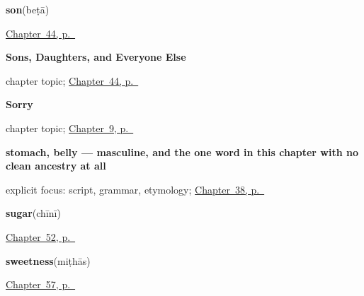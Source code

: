 \noindent\begin{minipage}[t]{\linewidth}
\raggedright
\textbf{son}\enspace\emph{}\enspace(beṭā)\par
\footnotesize \hyperref[ch:hi-sons-daughters]{Chapter~44, p.~\pageref*{ch:hi-sons-daughters}}
\end{minipage}\par\smallskip

\noindent\begin{minipage}[t]{\linewidth}
\raggedright
\textbf{Sons, Daughters, and Everyone Else}\par
\footnotesize chapter topic; \hyperref[ch:hi-sons-daughters]{Chapter~44, p.~\pageref*{ch:hi-sons-daughters}}
\end{minipage}\par\smallskip

\noindent\begin{minipage}[t]{\linewidth}
\raggedright
\textbf{Sorry}\par
\footnotesize chapter topic; \hyperref[ch:hi-sorry]{Chapter~9, p.~\pageref*{ch:hi-sorry}}
\end{minipage}\par\smallskip

\noindent\begin{minipage}[t]{\linewidth}
\raggedright
\textbf{stomach, belly — masculine, and the one word in this chapter with no clean ancestry at all}\enspace\emph{}\par
\footnotesize explicit focus: script, grammar, etymology; \hyperref[ch:hi-where-it-hurts]{Chapter~38, p.~\pageref*{ch:hi-where-it-hurts}}
\end{minipage}\par\smallskip

\noindent\begin{minipage}[t]{\linewidth}
\raggedright
\textbf{sugar}\enspace\emph{}\enspace(chīnī)\par
\footnotesize \hyperref[ch:hi-in-the-kitchen]{Chapter~52, p.~\pageref*{ch:hi-in-the-kitchen}}
\end{minipage}\par\smallskip

\noindent\begin{minipage}[t]{\linewidth}
\raggedright
\textbf{sweetness}\enspace\emph{}\enspace(miṭhās)\par
\footnotesize \hyperref[ch:hi-a-gift-and-a-feast]{Chapter~57, p.~\pageref*{ch:hi-a-gift-and-a-feast}}
\end{minipage}\par\smallskip

